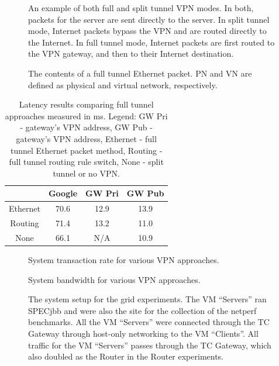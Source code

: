 \begin{figure}[ht]
\centering
{}
\caption[An example of both full and split tunnel VPN modes]{An example of both
full and split tunnel VPN modes.  In both, packets for the server are sent
directly to the server.  In split tunnel mode, Internet packets bypass the VPN
and are routed directly to the Internet.  In full tunnel mode, Internet packets
are first routed to the VPN gateway, and then to their Internet destination.}
\label{fig:tunnel}
\end{figure}

\begin{figure}[ht]
\centering
{}
\caption[The contents of a full tunnel Ethernet packet]{The contents of a full
tunnel Ethernet packet.  PN and VN are defined as physical and virtual network,
respectively.}
\label{fig:tunnel_packet}
\end{figure}

\begin{table}[ht]
\centering
\begin{tabular}{|c||c|c|c|} \hline
& Google & GW Pri & GW Pub \\ \hline \hline
Ethernet & 70.6 & 12.9 & 13.9 \\ \hline
Routing & 71.4 & 13.2 & 11.0 \\ \hline
None & 66.1 & N/A & 10.9 \\ \hline
\end{tabular}
\caption[Full tunnel evaluation]{Latency results comparing full tunnel
approaches measured in ms.  Legend: GW Pri - gateway's VPN address, GW Pub -
gateway's VPN address, Ethernet - full tunnel Ethernet packet method, Routing -
full tunnel routing rule switch, None - split tunnel or no VPN.}
\label{tab:full_tunnel_eval}
\end{table}

\clearpage

\begin{figure}[ht]
\centering
{}
\caption{System transaction rate for various VPN approaches.}
\label{fig:latency}
\end{figure}

\begin{figure}[ht]
\centering
{}
\caption{System bandwidth for various VPN approaches.}
\label{fig:bandwidth}
\end{figure}

\begin{figure}[ht]
\centering
{}
\caption[Grid evaluation setup]{The system setup for the grid experiments.  The
VM ``Servers'' ran SPECjbb and were also the site for the collection of the
netperf benchmarks.  All the VM ``Servers'' were connected through the TC
Gateway through host-only networking to the VM ``Clients''.  All traffic for
the VM ``Servers'' passes through the TC Gateway, which also doubled as the
Router in the Router experiments.}
\label{fig:gridsetup}
\end{figure}

